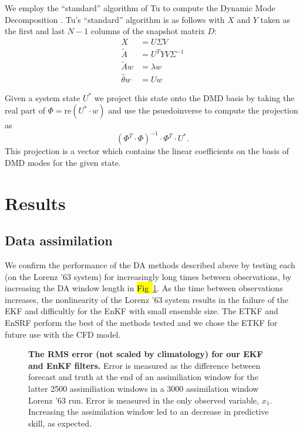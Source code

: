 \documentclass[10pt,letterpaper]{article}
\begin{document}
We employ the ``standard'' algorithm of Tu to compute the Dynamic Mode Decomposition \cite{tu2013dynamic}.
Tu's ``standard'' algorithm is as follows with $X$ and $Y$ taken as the first and last $N-1$ columns of the snapshot matrix $D$:
\begin{align*} X &= U\Sigma V \tag*{(Take SVD of $X$.)}\\
  \tilde{A} &= U^T Y V \Sigma ^{-1} \tag*{(Build the $A$ matrix.)}\\
  \tilde{A}w &= \lambda w \tag*{(Compute eigenvectors and values.)}\\
  \hat{\theta}w &= U w \tag*{(Compute corresponding modes.)}\end{align*}

Given a system state $U^*$ we project this state onto the DMD basis by taking the real part of $\Phi = \text{re}\left (U^*\cdot w\right)$ and use the psuedoinverse to compute the projection as $$(\Phi^T \cdot \Phi)^{-1} \cdot \Phi ^T \cdot U^*.$$
This projection is a vector which contains the linear coefficients on the basis of DMD modes for the given state.

\section*{Results}

\subsection*{Data assimilation}
\label{data_assimilation_section}

We confirm the performance of the DA methods described above by testing each (on the Lorenz '63 system) for increasingly long times between observations, by increasing the DA window length in \hl{Fig~}\ref{fig:window_test}.
As the time between observations increases, the nonlinearity of the Lorenz '63 system results in the failure of the EKF and difficultly for the EnKF with small ensemble size.
The ETKF and EnSRF perform the best of the methods tested and we chose the ETKF for future use with the CFD model.

\begin{figure}[h]
  \centering
  \caption[The RMS error is reported for our EKF and EnKF filters]{
\textbf{    The RMS error (not scaled by climatology) for our EKF and EnKF filters.
}    Error is measured as the difference between forecast and truth at the end of an assimiliation window for the latter 2500 assimiliation windows in a 3000 assimilation window Lorenz '63 run.
    Error is measured in the only observed variable, $x_1$.
    Increasing the assimilation window led to an decrease in predictive skill, as expected.
  }
  \label{fig:window_test}
\end{figure}
\end{document}
